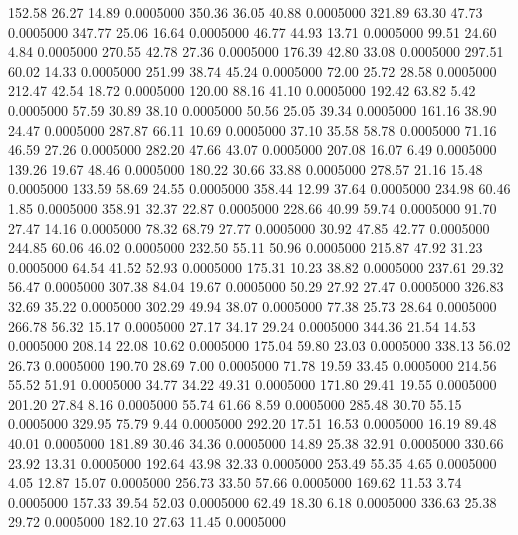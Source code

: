 152.58   26.27   14.89   0.0005000
 350.36   36.05   40.88   0.0005000
 321.89   63.30   47.73   0.0005000
 347.77   25.06   16.64   0.0005000
  46.77   44.93   13.71   0.0005000
  99.51   24.60    4.84   0.0005000
 270.55   42.78   27.36   0.0005000
 176.39   42.80   33.08   0.0005000
 297.51   60.02   14.33   0.0005000
 251.99   38.74   45.24   0.0005000
  72.00   25.72   28.58   0.0005000
 212.47   42.54   18.72   0.0005000
 120.00   88.16   41.10   0.0005000
 192.42   63.82    5.42   0.0005000
  57.59   30.89   38.10   0.0005000
  50.56   25.05   39.34   0.0005000
 161.16   38.90   24.47   0.0005000
 287.87   66.11   10.69   0.0005000
  37.10   35.58   58.78   0.0005000
  71.16   46.59   27.26   0.0005000
 282.20   47.66   43.07   0.0005000
 207.08   16.07    6.49   0.0005000
 139.26   19.67   48.46   0.0005000
 180.22   30.66   33.88   0.0005000
 278.57   21.16   15.48   0.0005000
 133.59   58.69   24.55   0.0005000
 358.44   12.99   37.64   0.0005000
 234.98   60.46    1.85   0.0005000
 358.91   32.37   22.87   0.0005000
 228.66   40.99   59.74   0.0005000
  91.70   27.47   14.16   0.0005000
  78.32   68.79   27.77   0.0005000
  30.92   47.85   42.77   0.0005000
 244.85   60.06   46.02   0.0005000
 232.50   55.11   50.96   0.0005000
 215.87   47.92   31.23   0.0005000
  64.54   41.52   52.93   0.0005000
 175.31   10.23   38.82   0.0005000
 237.61   29.32   56.47   0.0005000
 307.38   84.04   19.67   0.0005000
  50.29   27.92   27.47   0.0005000
 326.83   32.69   35.22   0.0005000
 302.29   49.94   38.07   0.0005000
  77.38   25.73   28.64   0.0005000
 266.78   56.32   15.17   0.0005000
  27.17   34.17   29.24   0.0005000
 344.36   21.54   14.53   0.0005000
 208.14   22.08   10.62   0.0005000
 175.04   59.80   23.03   0.0005000
 338.13   56.02   26.73   0.0005000
 190.70   28.69    7.00   0.0005000
  71.78   19.59   33.45   0.0005000
 214.56   55.52   51.91   0.0005000
  34.77   34.22   49.31   0.0005000
 171.80   29.41   19.55   0.0005000
 201.20   27.84    8.16   0.0005000
  55.74   61.66    8.59   0.0005000
 285.48   30.70   55.15   0.0005000
 329.95   75.79    9.44   0.0005000
 292.20   17.51   16.53   0.0005000
  16.19   89.48   40.01   0.0005000
 181.89   30.46   34.36   0.0005000
  14.89   25.38   32.91   0.0005000
 330.66   23.92   13.31   0.0005000
 192.64   43.98   32.33   0.0005000
 253.49   55.35    4.65   0.0005000
   4.05   12.87   15.07   0.0005000
 256.73   33.50   57.66   0.0005000
 169.62   11.53    3.74   0.0005000
 157.33   39.54   52.03   0.0005000
  62.49   18.30    6.18   0.0005000
 336.63   25.38   29.72   0.0005000
 182.10   27.63   11.45   0.0005000
